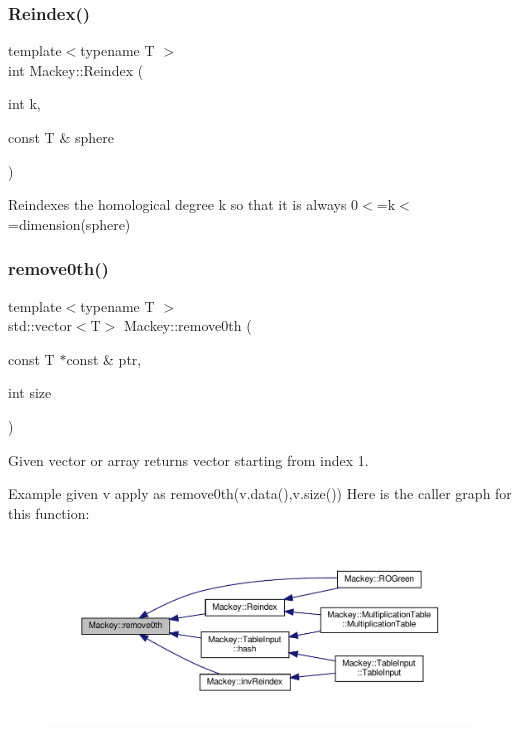 \subsubsection{\texorpdfstring{Reindex()}{Reindex()}\hspace{0.1cm}{\footnotesize\ttfamily [2/2]}}
{\footnotesize\ttfamily template$<$typename T $>$ \\
int Mackey\+::\+Reindex (\begin{DoxyParamCaption}\item[{int}]{k,  }\item[{const T \&}]{sphere }\end{DoxyParamCaption})\hspace{0.3cm}{\ttfamily [inline]}}



Reindexes the homological degree k so that it is always 0$<$=k$<$=dimension(sphere) 

\mbox{\label{namespaceMackey_abb4d03d1e773bb1004e3b41737ef2380}} 
\subsubsection{\texorpdfstring{remove0th()}{remove0th()}}
{\footnotesize\ttfamily template$<$typename T $>$ \\
std\+::vector$<$T$>$ Mackey\+::remove0th (\begin{DoxyParamCaption}\item[{const T $\ast$const \&}]{ptr,  }\item[{int}]{size }\end{DoxyParamCaption})\hspace{0.3cm}{\ttfamily [inline]}}



Given vector or array returns vector starting from index 1. 

Example given v apply as remove0th(v.\+data(),v.\+size()) Here is the caller graph for this function\+:\nopagebreak
\begin{figure}[H]
\begin{center}
\leavevmode
\includegraphics[width=350pt]{namespaceMackey_abb4d03d1e773bb1004e3b41737ef2380_icgraph}
\end{center}
\end{figure}
\mbox{\label{namespaceMackey_ad1e907ff76b07d4fc4c9d4bdf25918bd}} 
